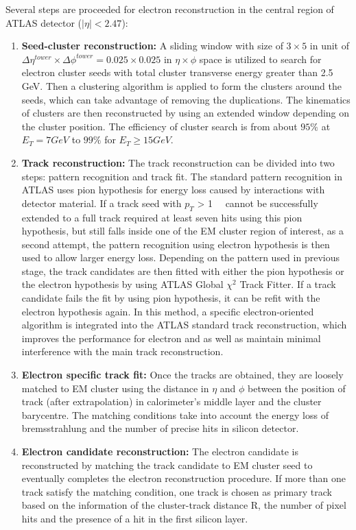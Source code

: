 Several steps are proceeded for electron reconstruction in the central region of ATLAS detector ($|\eta| < 2.47$):
\begin{enumerate}
	\item \textbf{Seed-cluster reconstruction:} A sliding window with size of $3 \times 5$ in unit of $\Delta\eta^{tower} \times \Delta\phi^{tower} = 0.025 \times 0.025$ in $\eta \times \phi$ space is utilized to search for electron cluster seeds with total cluster transverse energy greater than 2.5 GeV. Then a clustering algorithm\cite{Lampl:1099735} is applied to form the clusters around the seeds, which can take advantage of removing the duplications. The kinematics of clusters are then reconstructed by using an extended window depending on the cluster position. The efficiency of cluster search is from about $95\%$ at $E_{T} = 7 GeV$ to $99\%$ for $E_{T} \geq 15 GeV$.
	\item \textbf{Track reconstruction:} The track reconstruction can be divided into two steps: pattern recognition and track fit. The standard pattern recognition in ATLAS uses pion hypothesis for energy loss caused by interactions with detector material. If a track seed with $p_{T}$ > 1~\gev~ cannot be successfully extended to a full track required at least seven hits using this pion hypothesis, but still falls inside one of the EM cluster region of interest, as a second attempt, the pattern recognition using electron hypothesis is then used to allow larger energy loss.
Depending on the pattern used in previous stage, the track candidates are then fitted with either the pion hypothesis or the electron hypothesis by using ATLAS Global $\chi^{2}$ Track Fitter\cite{Cornelissen_2008}. If a track candidate fails the fit by using pion hypothesis, it can be refit with the electron hypothesis again. In this method, a specific electron-oriented algorithm is integrated into the ATLAS standard track reconstruction, which improves the performance for electron and as well as maintain minimal interference with the main track reconstruction. 
	\item \textbf{Electron specific track fit:} Once the tracks are obtained, they are loosely matched to EM cluster using the distance in $\eta$ and $\phi$ between the position of track (after extrapolation) in calorimeter's middle layer and the cluster barycentre. The matching conditions take into account the energy loss of bremsstrahlung and the number of precise hits in silicon detector.
	\item \textbf{Electron candidate reconstruction:} The electron candidate is reconstructed by matching the track candidate to EM cluster seed to eventually completes the electron reconstruction procedure. If more than one track satisfy the matching condition, one track is chosen as primary track based on the information of the cluster-track distance R, the number of pixel hits and the presence of a hit in the first silicon layer\cite{ATLAS-CONF-2014-032}.

\end{enumerate}
